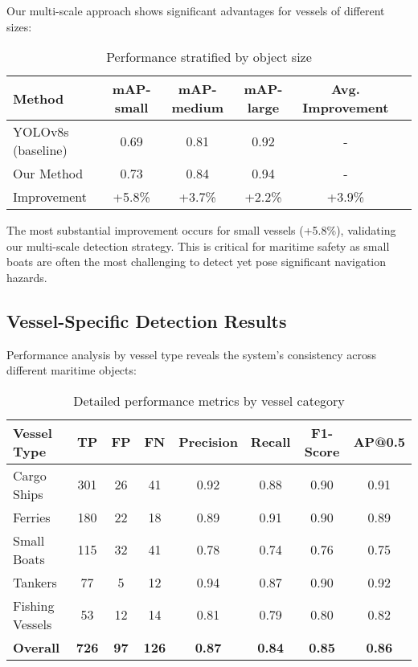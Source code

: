 \documentclass[10pt]{article}
\begin{document}
Our multi-scale approach shows significant advantages for vessels of different sizes:

\begin{table}[ht]
\centering
\caption{Performance stratified by object size}
\label{tab:scale_performance}
\begin{tabular}{lccccc}
\toprule
Method & mAP-small & mAP-medium & mAP-large & Avg. Improvement \\
\midrule
YOLOv8s (baseline) & 0.69 & 0.81 & 0.92 & - \\
Our Method & 0.73 & 0.84 & 0.94 & - \\
\midrule
Improvement & +5.8\% & +3.7\% & +2.2\% & +3.9\% \\
\bottomrule
\end{tabular}
\end{table}

The most substantial improvement occurs for small vessels (+5.8\%), validating our multi-scale detection strategy. This is critical for maritime safety as small boats are often the most challenging to detect yet pose significant navigation hazards.

\subsection{Vessel-Specific Detection Results}

Performance analysis by vessel type reveals the system's consistency across different maritime objects:

\begin{table}[ht]
\centering
\caption{Detailed performance metrics by vessel category}
\label{tab:vessel_detailed}
\begin{tabular}{lccccccc}
\toprule
Vessel Type & TP & FP & FN & Precision & Recall & F1-Score & AP@0.5 \\
\midrule
Cargo Ships & 301 & 26 & 41 & 0.92 & 0.88 & 0.90 & 0.91 \\
Ferries & 180 & 22 & 18 & 0.89 & 0.91 & 0.90 & 0.89 \\
Small Boats & 115 & 32 & 41 & 0.78 & 0.74 & 0.76 & 0.75 \\
Tankers & 77 & 5 & 12 & 0.94 & 0.87 & 0.90 & 0.92 \\
Fishing Vessels & 53 & 12 & 14 & 0.81 & 0.79 & 0.80 & 0.82 \\
\midrule
\textbf{Overall} & \textbf{726} & \textbf{97} & \textbf{126} & \textbf{0.87} & \textbf{0.84} & \textbf{0.85} & \textbf{0.86} \\
\bottomrule
\end{tabular}
\end{table}
\end{document}
